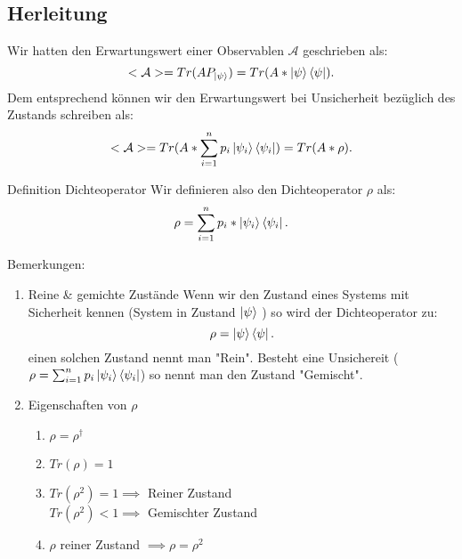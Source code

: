 \documentclass{report}
\begin{document}
\subsection{Herleitung}
Wir hatten den Erwartungswert einer Observablen $\mathcal{A}$ geschrieben als: \[
	<\mathcal{A}> = Tr(AP_{\ket{\psi}}) = Tr(A * \ket{\psi}\bra{\psi})
.\] Dem entsprechend können wir den Erwartungswert bei Unsicherheit bezüglich des Zustands schreiben als: \[
<\mathcal{A}> = Tr(A * \sum_{i=1}^{n} p_i \ket{\psi_i}\bra{\psi_i}) = Tr(A * \rho) 
.\] 
\begin{redbox}{Definition Dichteoperator}
	Wir definieren also den Dichteoperator $\rho$ als:  \[
	\rho = \sum_{i=1}^{n} p_i*\ket{\psi_i}\bra{\psi_i}  
	.\]
\end{redbox}
Bemerkungen:
\begin{enumerate}
	\item Reine \& gemichte Zustände
		Wenn wir den Zustand eines Systems mit Sicherheit kennen (System in Zustand $\ket{\psi} $ ) so wird der Dichteoperator zu: \[
		\rho = \ket{\psi}\bra{\psi}  
	.\]  einen solchen Zustand nennt man "Rein". Besteht eine Unsichereit ($\rho = \sum_{i=1}^{n} p_i \ket{\psi_i} \bra{\psi_i}$) so nennt man den Zustand "Gemischt".
\item Eigenschaften von $\rho$ 
	\begin{enumerate}
		\item $\rho = \rho^\dagger$
		\item $Tr(\rho) = 1$ 
		\item $Tr(\rho^2) = 1 \implies $ Reiner Zustand \\
			$Tr(\rho^2) < 1 \implies $ Gemischter Zustand
		\item $\rho$ reiner Zustand $\implies \rho = \rho^2$
	\end{enumerate}
\end{enumerate}
\end{document}
